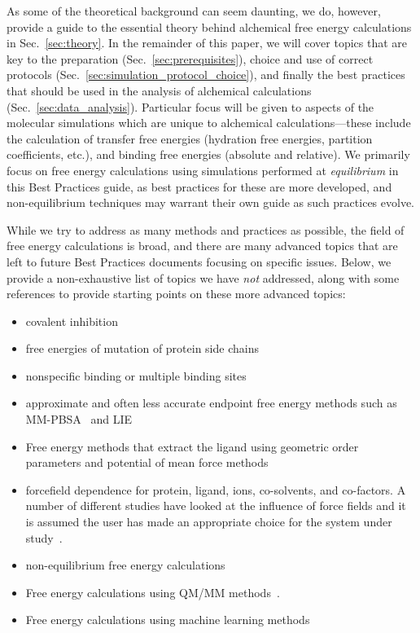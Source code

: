 \documentclass[9pt,bestpractices]{livecoms}
\begin{document}
As some of the theoretical background can seem daunting, we do, however, provide a guide to the essential theory behind alchemical free energy calculations in Sec.~\ref{sec:theory}.
In the remainder of this paper, we will cover topics that are key to the preparation (Sec.~\ref{sec:prerequisites}), choice and use of correct protocols (Sec.~\ref{sec:simulation_protocol_choice}), and finally the best practices that should be used in the analysis of alchemical calculations (Sec.~\ref{sec:data_analysis}). 
Particular focus will be given to aspects of the molecular simulations which are unique to alchemical calculations---these include the calculation of transfer free energies (hydration free energies, partition coefficients, etc.), and binding free energies (absolute and relative). We primarily focus on free energy calculations using simulations performed at \emph{equilibrium} in this Best Practices guide, as best practices for these are more developed, and non-equilibrium techniques may warrant their own guide as such practices evolve. 


While we try to address as many methods and practices as possible, the field of free energy calculations is broad, and there are many advanced topics that are left to future Best Practices documents focusing on specific issues. 
Below, we provide a non-exhaustive list of topics we have \emph{not} addressed, along with some references to provide starting points on these more advanced topics:
\begin{itemize}
\item covalent inhibition~\cite{lameira2019predicting}
\item free energies of mutation of protein side chains~\cite{gapsys2016accurate,aldeghi2018accurate}
\item nonspecific binding or multiple binding sites~\cite{gill2018binding}
\item approximate and often less accurate endpoint free energy methods such as MM-PBSA~\cite{genheden2015mm} and LIE~\cite{gutierrez-de-teran2012linear}
\item Free energy methods that extract the ligand using geometric order parameters and potential of mean force methods~\cite{heinzelmann2017attachpullrelease}
\item forcefield dependence for protein, ligand, ions, co-solvents, and co-factors. A number of different studies have looked at the influence of force fields and it is assumed the user has made an appropriate choice for the system under study~\cite{loeffler2018reproducibility, vassetti2019assessment, lopes2015current}. 
\item non-equilibrium free energy calculations~\cite{gapsys2020large}
\item Free energy calculations using QM/MM methods~\cite{beierlein2011simple,dybeck2016comparison,cave-ayland2015direct,Karwounopoulos2024}.
\item Free energy calculations using machine learning methods~\cite{rufa2020chemical, scheen2020hybrid, cole2020machine,Schoeller2023}
\end{itemize}
\end{document}
